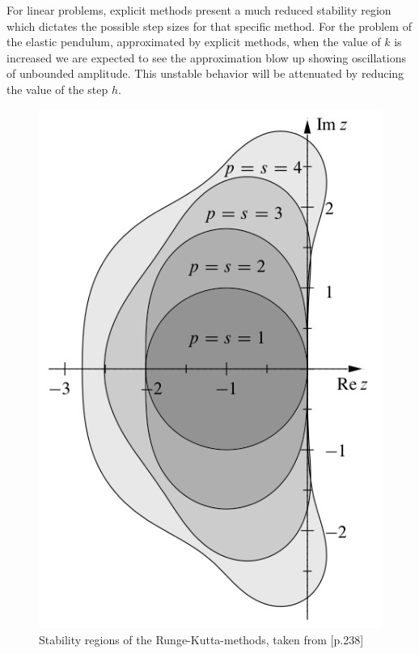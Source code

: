 \documentclass{report}
\begin{document}
For linear problems, explicit methods present a much reduced stability region which dictates the possible step sizes for that specific method.
For the problem of the elastic pendulum, approximated by explicit methods, when the value of $k$ is increased we are expected to see the approximation blow up showing oscillations of unbounded amplitude.
This unstable behavior will be attenuated by reducing the value of the step $h$.

\begin{figure}[h]
\centering
\begin{minipage}[b]{0.45\textwidth}
\centering
\includegraphics[width=\textwidth]{../Drawings/Runge_Kutter_stability_regions}
\caption{Stability regions of the Runge-Kutta-methods, taken from \cite{Stab_RK}[p.238]}
\end{minipage}
\end{figure}
\end{document}
